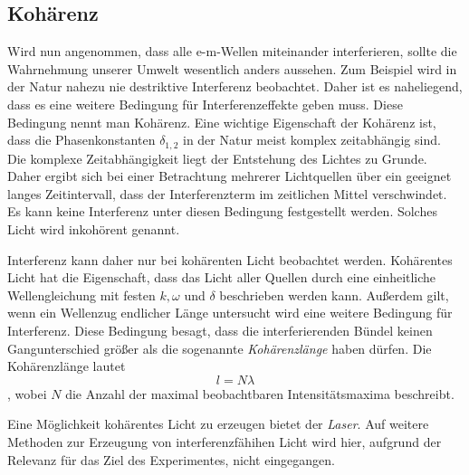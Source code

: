 \subsection{Kohärenz}
\label{subsec:Kohärenz}
Wird nun angenommen, dass alle e-m-Wellen miteinander interferieren, sollte die Wahrnehmung unserer Umwelt wesentlich anders aussehen. Zum Beispiel wird in der Natur nahezu 
nie destriktive Interferenz beobachtet. Daher ist es naheliegend, dass es eine weitere Bedingung für Interferenzeffekte geben muss. Diese Bedingung nennt man Kohärenz. 
Eine wichtige Eigenschaft der Kohärenz ist, dass die Phasenkonstanten $\delta_{1,2}$ in der Natur meist komplex zeitabhängig sind. Die komplexe Zeitabhängigkeit liegt der 
Entstehung des Lichtes zu Grunde. Daher ergibt sich bei einer Betrachtung mehrerer Lichtquellen über ein geeignet langes Zeitintervall, dass der Interferenzterm im zeitlichen 
Mittel verschwindet. Es kann keine Interferenz unter diesen Bedingung festgestellt werden. Solches Licht wird inkohörent genannt. 

Interferenz kann daher nur bei kohärenten Licht beobachtet werden. Kohärentes Licht hat die Eigenschaft, dass das Licht aller Quellen durch eine einheitliche Wellengleichung 
mit festen $k, \omega$ und $\delta$ beschrieben werden kann. Außerdem gilt, wenn ein Wellenzug endlicher Länge untersucht wird eine weitere Bedingung für Interferenz. 
Diese Bedingung besagt, dass die interferierenden Bündel keinen Gangunterschied größer als die sogenannte \textit{Kohärenzlänge} haben dürfen. Die Kohärenzlänge lautet 
\begin{equation*}
    l = N\lambda
\end{equation*}  
, wobei $N$ die Anzahl der maximal beobachtbaren Intensitätsmaxima beschreibt. 

Eine Möglichkeit kohärentes Licht zu erzeugen bietet der \textit{Laser}. Auf weitere Methoden zur Erzeugung von interferenzfähihen Licht wird hier, aufgrund der Relevanz 
für das Ziel des Experimentes, nicht eingegangen. 

